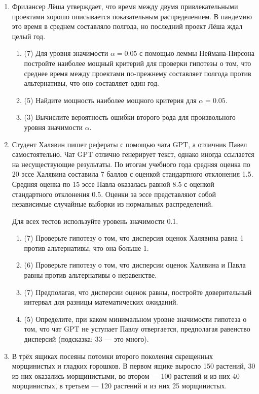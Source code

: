 \begin{enumerate}
\item Фрилансер Лёша утверждает, что время между двумя привлекательными проектами хорошо описывается показательным распределением. 
В пандемию это время в среднем составляло полгода, но последний проект Лёша ждал целый год. 

\begin{enumerate}
\item (7) Для уровня значимости $\alpha=0.05$ с помощью леммы Неймана-Пирсона постройте наиболее мощный критерий для проверки гипотезы о том, что среднее время между проектами по-прежнему составляет полгода против альтернативы, что оно составляет один год.
\item (5) Найдите мощность наиболее мощного критерия для $\alpha=0.05$.
\item (3) Вычислите вероятность ошибки второго рода для произвольного уровня значимости $\alpha$.
\end{enumerate}

\item 
Студент Халявин пишет рефераты с помощью чата GPT, а отличник Павел самостоятельно. 
Чат GPT отлично генерирует текст, однако иногда ссылается на несуществующие результаты. 
По итогам учебного года средняя оценка по 20 эссе Халявина составила 7 баллов с оценкой стандартного отклонения 1.5.
Средняя оценка по 15 эссе Павла оказалась равной 8.5 с оценкой стандартного отклонения 0.5. 
Оценки за эссе представляют собой независимые случайные выборки из нормальных распределений.

Для всех тестов используйте уровень значимости 0.1.

\begin{enumerate}
\item (7) Проверьте гипотезу о том, что дисперсия оценок Халявина равна 1 против альтернативы, что она больше 1.
\item (6) Проверьте гипотезу о том, что дисперсии оценок Халявина и Павла равны против альтернативы о неравенстве.
\item (7) Предполагая, что дисперсии оценок равны, постройте доверительный интервал для разницы математических ожиданий.
\item (5) Определите, при каком минимальном уровне значимости гипотеза о том, что чат GPT не уступает Павлу отвергается, предполагая равенство дисперсий (подсказка: 33 — это много).
\end{enumerate}


\item В трёх ящиках посеяны потомки второго поколения скрещенных морщинистых и гладких горошков.  
В первом ящике выросло 150 растений, 30 из них оказались морщинистыми, 
во втором — 100 растений и из них 40 морщинистых, в третьем — 120 растений и из них 25 морщинистых.


\end{enumerate}
